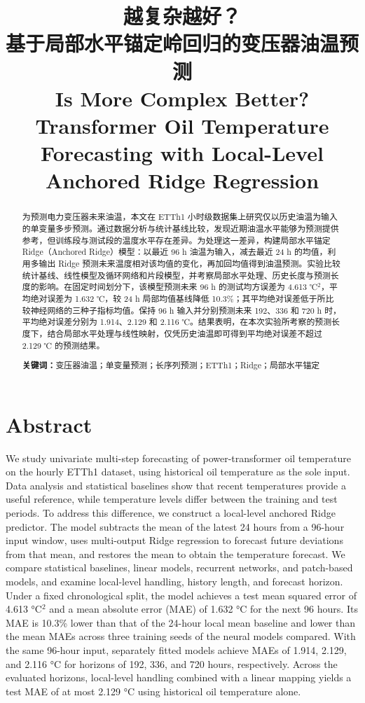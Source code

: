 \documentclass[UTF8,a4paper,11pt,fontset=windows]{ctexart}
\title{\bfseries 越复杂越好？\\[0.3em]
基于局部水平锚定岭回归的变压器油温预测\\[0.7em]
\large Is More Complex Better?\\
Transformer Oil Temperature Forecasting with Local-Level Anchored Ridge Regression}
\date{}
\begin{document}
\pagestyle{plain}
\maketitle
\begin{abstract}
为预测电力变压器未来油温，本文在 ETTh1 小时级数据集上研究仅以历史油温为输入的单变量多步预测。通过数据分析与统计基线比较，发现近期油温水平能够为预测提供参考，但训练段与测试段的温度水平存在差异。为处理这一差异，构建局部水平锚定 Ridge（Anchored Ridge）模型：以最近 96 h 油温为输入，减去最近 24 h 的均值，利用多输出 Ridge 预测未来温度相对该均值的变化，再加回均值得到油温预测。实验比较统计基线、线性模型及循环网络和片段模型，并考察局部水平处理、历史长度与预测长度的影响。在固定时间划分下，该模型预测未来 96 h 的测试均方误差为 4.613 ℃$^2$，平均绝对误差为 1.632 ℃，较 24 h 局部均值基线降低 10.3\%；其平均绝对误差低于所比较神经网络的三种子指标均值。保持 96 h 输入并分别预测未来 192、336 和 720 h 时，平均绝对误差分别为 1.914、2.129 和 2.116 ℃。结果表明，在本次实验所考察的预测长度下，结合局部水平处理与线性映射，仅凭历史油温即可得到平均绝对误差不超过 2.129 ℃ 的预测结果。

\vspace{0.5em}
\noindent\textbf{关键词：}变压器油温；单变量预测；长序列预测；ETTh1；Ridge；局部水平锚定
\end{abstract}

\section*{Abstract}
We study univariate multi-step forecasting of power-transformer oil temperature on the hourly ETTh1 dataset, using historical oil temperature as the sole input. Data analysis and statistical baselines show that recent temperatures provide a useful reference, while temperature levels differ between the training and test periods. To address this difference, we construct a local-level anchored Ridge predictor. The model subtracts the mean of the latest 24 hours from a 96-hour input window, uses multi-output Ridge regression to forecast future deviations from that mean, and restores the mean to obtain the temperature forecast. We compare statistical baselines, linear models, recurrent networks, and patch-based models, and examine local-level handling, history length, and forecast horizon. Under a fixed chronological split, the model achieves a test mean squared error of 4.613 °C$^2$ and a mean absolute error (MAE) of 1.632 °C for the next 96 hours. Its MAE is 10.3\% lower than that of the 24-hour local mean baseline and lower than the mean MAEs across three training seeds of the neural models compared. With the same 96-hour input, separately fitted models achieve MAEs of 1.914, 2.129, and 2.116 °C for horizons of 192, 336, and 720 hours, respectively. Across the evaluated horizons, local-level handling combined with a linear mapping yields a test MAE of at most 2.129 °C using historical oil temperature alone.
\end{document}
